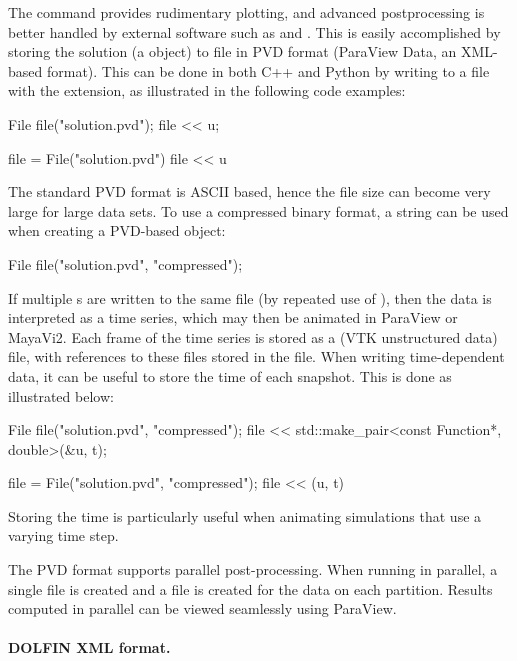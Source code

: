 The  command provides rudimentary plotting, and advanced
postprocessing is better handled by external software such as
\citet{www:paraview} and \citet{www:mayavi}. This is easily
accomplished by storing the solution (a  object) to file
in PVD format (ParaView Data, an XML-based format). This can be done
in both C++ and Python by writing to a file with the 
extension, as illustrated in the following code examples:
\begin{c++}
File file("solution.pvd");
file << u;
\end{c++}
\pagebreak
\begin{python}
file = File("solution.pvd")
file << u
\end{python}
The standard PVD format is ASCII based, hence the file size can
become very large for large data sets. To use a compressed binary
format, a string  can be used when creating a
PVD-based  object:
\begin{c++}
File file("solution.pvd", "compressed");
\end{c++}
If multiple s are written to the same file (by repeated
use of \emp{<{}<}), then the data is interpreted as a time series,
which may then be animated in ParaView or MayaVi2. Each frame of the
time series is stored as a  (VTK unstructured data) file,
with references to these files stored in the  file.  When
writing time-dependent data, it can be useful to store the time
 of each snapshot. This is done as illustrated below:
\begin{c++}
File file("solution.pvd", "compressed");
file << std::make_pair<const Function*, double>(&u, t);
\end{c++}
\begin{python}
file = File("solution.pvd", "compressed");
file << (u, t)
\end{python}
Storing the time is particularly useful when animating simulations that
use a varying time step.

The PVD format supports parallel post-processing. When running in
parallel, a single  file is created and a  file is
created for the data on each partition. Results computed in parallel
can be viewed seamlessly using ParaView.

\paragraph{DOLFIN XML format.}

